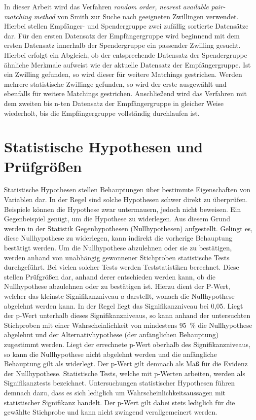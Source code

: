 In dieser Arbeit wird das Verfahren \textit{random order, nearest available pair-matching method} von Smith zur Suche nach geeigneten Zwillingen verwendet. Hierbei stellen Empfänger- und Spendergruppe zwei zufällig sortierte Datensätze dar. Für den ersten Datensatz der Empfängergruppe wird beginnend mit dem ersten Datensatz innerhalb der Spendergruppe ein passender Zwilling gesucht. Hierbei erfolgt ein Abgleich, ob der entsprechende Datensatz der Spendergruppe ähnliche Merkmale aufweist wie der aktuelle Datensatz der Empfängergruppe. Ist ein Zwilling gefunden, so wird dieser für weitere Matchings gestrichen. Werden mehrere statistische Zwillinge gefunden, so wird der erste ausgewählt und ebenfalls für weitere Matchings gestrichen. Anschließend wird das Verfahren mit dem zweiten bis n-ten Datensatz der Empfängergruppe in gleicher Weise wiederholt, bis die Empfängergruppe vollständig durchlaufen ist. \parencite{smith_matching_1997, bacher_statistisches_2002}

\section{Statistische Hypothesen und Prüfgrößen}

Statistische Hypothesen stellen Behauptungen über bestimmte Eigenschaften von Variablen dar. In der Regel sind solche Hypothesen schwer direkt zu überprüfen. Beispiele können die Hypothese zwar untermauern, jedoch nicht beweisen. Ein Gegenbeispiel genügt, um die Hypothese zu widerlegen. Aus diesem Grund werden in der Statistik Gegenhypothesen (Nullhypothesen) aufgestellt. Gelingt es, diese Nullhypothese zu widerlegen, kann indirekt die vorherige Behauptung bestätigt werden. Um die Nullhypothese abzulehnen oder sie zu bestätigen, werden anhand von unabhängig gewonnener Stichproben statistische Tests durchgeführt. Bei vielen solcher Tests werden Teststatistiken berechnet. Diese stellen Prüfgrößen dar, anhand derer entschieden werden kann, ob die Nullhypothese abzulehnen oder zu bestätigen ist. Hierzu dient der P-Wert, welcher das kleinste Signifikanzniveau $a$ darstellt, wonach die Nullhypothese abgelehnt werden kann. In der Regel liegt das Signifikanzniveau bei 0,05. Liegt der p-Wert unterhalb dieses Signifikanzniveaus, so kann anhand der untersuchten Stichproben mit einer Wahrscheinlichkeit von mindestens 95~\% die Nullhypothese abgelehnt und der Alternativhypothese (der anfänglichen Behauptung) zugestimmt werden. Liegt der errechnete p-Wert oberhalb des Signifikanzniveaus, so kann die Nullhypothese nicht abgelehnt werden und die anfängliche Behauptung gilt als widerlegt. Der p-Wert gilt demnach als Maß für die Evidenz der Nullhypothese. Statistische Tests, welche mit p-Werten arbeiten, werden als Signifikanztests bezeichnet. Untersuchungen statistischer Hypothesen führen demnach dazu, dass es sich lediglich um Wahrscheinlichkeitsaussagen mit statistischer Signifikanz handelt. Der p-Wert gilt dabei stets lediglich für die gewählte Stichprobe und kann nicht zwingend verallgemeinert werden. \parencite{hedderich_angewandte_2016}

